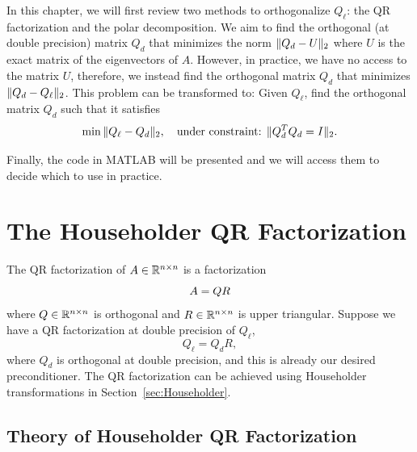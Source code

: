 In this chapter, we will first review two methods to orthogonalize $Q_\ell$: the QR factorization and the polar decomposition. We aim to find the orthogonal (at double precision) matrix $Q_d$ that minimizes the norm $\|{Q_d - U}\|_2$ where $U$ is the exact matrix of the eigenvectors of $A$. However, in practice, we have no access to the matrix $U$, therefore, we instead find the orthogonal matrix $Q_d$ that minimizes $\|{Q_d - Q_\ell}\|_2$. This problem can be transformed to: Given $Q_\ell$, find the orthogonal matrix $Q_d$ such that it satisfies
\begin{equation}\notag
  \min{\|{Q_\ell - Q_d}\|_2},\quad \text{under constraint: $\|{Q_d^T Q_d  = I}\|_2$.}
\end{equation}

Finally, the code in MATLAB will be presented and we will access them to decide which to use in practice.

\section{The Householder QR Factorization}\label{sec:Householder-QR}
The QR factorization of $A\in\mathbb{R}^{n\times n}$ is a factorization
\begin{equation}\notag
    A = QR
\end{equation}
where $Q\in\mathbb{R}^{n\times n}$ is orthogonal and $R\in\mathbb{R}^{n\times n}$ is upper triangular. Suppose we have a QR factorization at double precision of $Q_\ell$,
\begin{equation}\label{eq.2.2}
    Q_\ell = Q_d R,
\end{equation}
where $Q_d$ is orthogonal at double precision, and this is already our desired preconditioner. The QR factorization can be achieved using Householder transformations in Section~\ref{sec:Householder}. 

\subsection{Theory of Householder QR Factorization}\label{subsec.houseQR}


